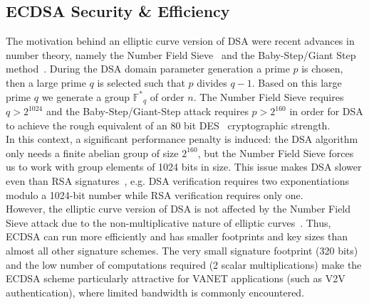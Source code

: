 \documentclass[11pt,twocolumn]{IEEEtran}
\begin{document}
\subsection{ECDSA Security \& Efficiency} \label{security}
The motivation behind an elliptic curve version of DSA were recent advances in number theory, namely the Number Field Sieve~\cite{sieve} and the Baby-Step/Giant Step method~\cite{babystep}. During the DSA domain parameter generation a prime $p$ is chosen, then a large prime $q$ is selected such that $p$ divides $q-1$. Based on this large prime $q$ we generate a group $\mathbb{F^*}_q$ of order $n$. The Number Field Sieve requires $q>2^{1024}$ and the Baby-Step/Giant-Step attack requires $p>2^{160}$ in order for DSA to achieve the rough equivalent of an 80 bit DES~\cite{des} cryptographic strength.\\
In this context, a significant performance penalty is induced: the DSA algorithm only needs a finite abelian group of size $2^{160}$, but the Number Field Sieve forces us to work with group elements of 1024 bits in size.  This issue makes DSA slower even than RSA signatures~\cite{rsa}, e.g. DSA verification requires two exponentiations modulo a 1024-bit number while RSA verification requires only one.\\
However, the elliptic curve version of DSA is not affected by the Number Field Sieve attack due to the non-multiplicative nature of elliptic curves~\cite{koblitz}. Thus, ECDSA can run more efficiently and has smaller footprints and key sizes than almost all other signature schemes. The very small signature footprint (320 bits) and the low number of computations required (2 scalar multiplications) make the ECDSA scheme particularly attractive for VANET applications (such as V2V authentication), where limited bandwidth is commonly encountered.
\end{document}
